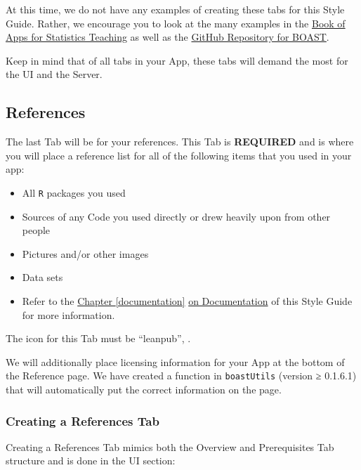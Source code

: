 \documentclass[
]{book}
\providecommand{\tightlist}{%
  \setlength{\itemsep}{0pt}\setlength{\parskip}{0pt}}
\begin{document}
At this time, we do not have any examples of creating these tabs for this Style Guide. Rather, we encourage you to look at the many examples in the \href{https://sites.psu.edu/shinyapps/}{Book of Apps for Statistics Teaching} as well as the \href{https://github.com/EducationShinyAppTeam}{GitHub Repository for BOAST}.

Keep in mind that of all tabs in your App, these tabs will demand the most for the UI and the Server.

\hypertarget{refTab}{%
\subsection{References}\label{refTab}}

The last Tab will be for your references. This Tab is \textbf{REQUIRED} and is where you will place a reference list for all of the following items that you used in your app:

\begin{itemize}
\tightlist
\item
  All \texttt{R} packages you used
\item
  Sources of any Code you used directly or drew heavily upon from other people
\item
  Pictures and/or other images
\item
  Data sets
\item
  Refer to the \protect\hyperlink{documentation}{Chapter \ref{documentation}} \protect\hyperlink{documentation}{on Documentation} of this Style Guide for more information.
\end{itemize}

The icon for this Tab must be ``leanpub'', .

We will additionally place licensing information for your App at the bottom of the Reference page. We have created a function in \texttt{boastUtils} (version ≥ 0.1.6.1) that will automatically put the correct information on the page.

\hypertarget{creating-a-references-tab}{%
\subsubsection{Creating a References Tab}\label{creating-a-references-tab}}

Creating a References Tab mimics both the Overview and Prerequisites Tab structure and is done in the UI section:
\end{document}
